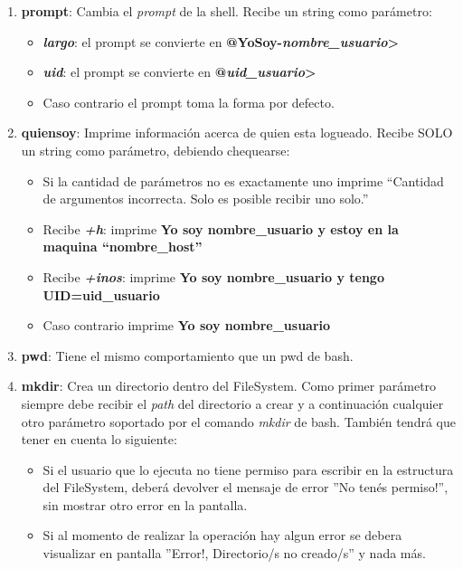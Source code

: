 \begin{enumerate}
\begin{enumerate}
\begin{enumerate}
		 \item \textbf{prompt}: Cambia el \textit{prompt} de la shell. Recibe un string como parámetro:
		 \begin{itemize}
		 	\item \textbf{\emph{largo}}: el prompt se convierte en \textbf{@YoSoy-\emph{nombre\_usuario}>}
		 	\item \textbf{\emph{uid}}: el prompt se convierte en \textbf{@\emph{uid\_usuario}>}
		 	\item Caso contrario el prompt toma la forma por defecto.
		 \end{itemize}
	     
		 \item \textbf{quiensoy}: Imprime información acerca de quien esta logueado. Recibe SOLO un string como parámetro, debiendo chequearse:
		 \begin{itemize}
		 	\item Si la cantidad de parámetros no es exactamente uno imprime ``Cantidad de argumentos incorrecta. Solo es posible recibir uno solo.''
		 	\item Recibe \textbf{\emph{+h}}: imprime \textbf{Yo soy nombre\_usuario y estoy en la maquina ``nombre\_host''}
		 	\item Recibe \textbf{\emph{+inos}}: imprime \textbf{Yo soy nombre\_usuario y tengo UID=uid\_usuario}
		 	\item Caso contrario imprime \textbf{Yo soy nombre\_usuario}
		 \end{itemize}

	     \item \textbf{pwd}: Tiene el mismo comportamiento que un pwd de bash.
	     
	     \item \textbf{mkdir}: Crea un directorio dentro del FileSystem. Como primer parámetro siempre debe recibir el \textit{path} del directorio a crear y a continuación cualquier otro parámetro soportado por el comando \emph{mkdir} de bash. También tendrá que tener en cuenta lo siguiente:
	     \begin{itemize}
	     	\item Si el usuario que lo ejecuta no tiene permiso para escribir en la estructura del FileSystem, deberá devolver el mensaje de error ”No tenés permiso!”, sin mostrar otro error en la pantalla.
	     	\item Si al momento de realizar la operación hay algun error se debera visualizar en pantalla ”Error!, Directorio/s no creado/s” y nada más.
	     \end{itemize}	      
	    \end{enumerate}


\end{enumerate}
\end{enumerate}

